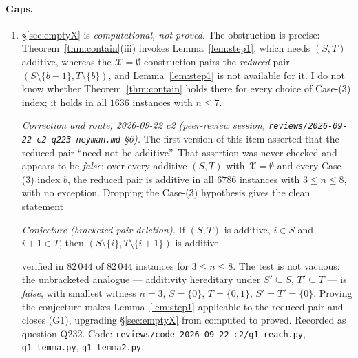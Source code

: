 \documentclass[11pt]{article}
\theoremstyle{definition}
\newcommand{\XX}{\mathcal{X}}
\begin{document}
\paragraph{Gaps.}
\begin{enumerate}
\item[(G1)] \S\ref{sec:emptyX} is \emph{computational, not proved}. The obstruction is precise:
Theorem~\ref{thm:contain}(iii) invokes Lemma~\ref{lem:step1}, which needs $(S,T)$ additive,
whereas the $\XX=\emptyset$ construction pairs the \emph{reduced} pair
$(S\setminus\{b-1\},T\setminus\{b\})$, and Lemma~\ref{lem:step1} is not available for it.
I do not know whether Theorem~\ref{thm:contain} holds there for every choice of Case-(3)
index; it holds in all $1636$ instances with $n\le7$.

\emph{Correction and route, 2026-09-22 c2 (peer-review session,
\texttt{reviews/2026-09-22-c2-q223-neyman.md} \S6).} The first version of this item asserted
that the reduced pair ``need not be additive''. That assertion was never checked and appears to
be \emph{false}: over every additive $(S,T)$ with $\XX=\emptyset$ and every Case-(3) index
$b$, the reduced pair is additive in all $6786$ instances with $3\le n\le 8$, with no
exception. Dropping the Case-(3) hypothesis gives the clean statement

\smallskip
\emph{Conjecture (bracketed-pair deletion).} If $(S,T)$ is additive, $i\in S$ and $i+1\in T$,
then $(S\setminus\{i\},T\setminus\{i+1\})$ is additive.
\smallskip

\noindent verified in $82\,044$ of $82\,044$ instances for $3\le n\le 8$. The test is not
vacuous: the unbracketed analogue --- additivity hereditary under $S'\subseteq S$,
$T'\subseteq T$ --- is \emph{false}, with smallest witness $n=3$, $S=\{0\}$, $T=\{0,1\}$,
$S'=T'=\{0\}$. Proving the conjecture makes Lemma~\ref{lem:step1} applicable to the reduced
pair and closes (G1), upgrading \S\ref{sec:emptyX} from computed to proved. Recorded as
question Q232. Code:
\texttt{reviews/code-2026-09-22-c2/g1\_reach.py}, \texttt{g1\_lemma.py},
\texttt{g1\_lemma2.py}.


\end{enumerate}
\end{document}
